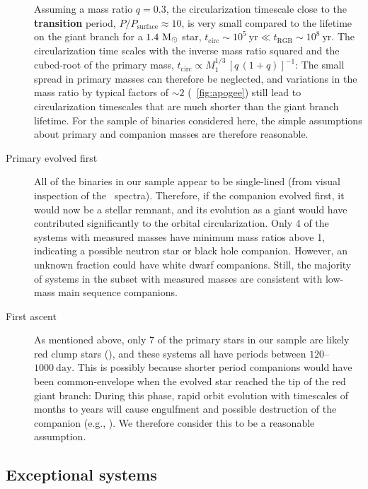 \documentclass[modern, letterpaper]{aastex62}
\newcommand{\apogee}{\project{\acronym{APOGEE}}}
\newcommand{\Psurf}{\ensuremath{P_\textrm{surface}}}
\renewcommand{\changes}[1]{\textbf{#1}}
\begin{document}
\begin{description}
    Assuming a mass ratio $q = 0.3$, the circularization timescale close to the
    \changes{transition} period, $P / \Psurf \approx 10$, is very small compared
    to the lifetime on the giant branch for a $1.4~\mathrm{M}_\odot$ star, $t_\textrm{circ}
    \sim 10^5~\textrm{yr} \ll t_\textrm{RGB} \sim 10^8~\textrm{yr}$.
    The circularization time scales with the inverse mass ratio squared and the
    cubed-root of the primary mass, $t_\textrm{circ} \propto M_1^{1/3} \, \left[
    q \, (1 + q) \right]^{-1}$:
    The small spread in primary masses can therefore be neglected, and
    variations in the mass ratio by typical factors of $\sim 2$
    (\figurename~\ref{fig:apogee}) still lead to circularization timescales that
    are much shorter than the giant branch lifetime.
    For the sample of binaries considered here, the simple assumptions about
    primary and companion masses are therefore reasonable.
    \item[Primary evolved first] All of the binaries in our sample appear to be
    single-lined (from visual inspection of the \apogee\ spectra).
    Therefore, if the companion evolved first, it would now be a stellar
    remnant, and its evolution as a giant would have contributed significantly
    to the orbital circularization.
    Only 4 of the systems with measured masses have minimum mass ratios above 1,
    indicating a possible neutron star or black hole companion.
    However, an unknown fraction could have white dwarf companions.
    Still, the majority of systems in the subset with measured masses are
    consistent with low-mass main sequence companions.
    \item[First ascent] As mentioned above, only 7 of the primary stars in our
    sample are likely red clump stars (\citealt{Ting:2018}), and these systems
    all have periods between $120$--$1000~\textrm{day}$.
    This is possibly because shorter period companions would have been
    common-envelope when the evolved star reached the tip of the red giant
    branch: During this phase, rapid orbit evolution with timescales of months
    to years will cause engulfment and possible destruction of the companion
    (e.g., \citealt{Nordhaus:2010}).
    We therefore consider this to be a reasonable assumption.
\end{description}


\subsection{Exceptional systems}
\label{sec:exc}
\end{document}
